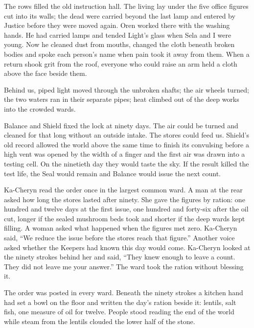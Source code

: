 The rows filled the old instruction hall. The living lay under the five office figures cut into its walls; the dead were carried beyond the last lamp and entered by Justice before they were moved again. Oren worked there with the washing hands. He had carried lamps and tended Light's glass when Sela and I were young. Now he cleaned dust from mouths, changed the cloth beneath broken bodies and spoke each person's name when pain took it away from them. When a return shook grit from the roof, everyone who could raise an arm held a cloth above the face beside them.\par

Behind us, piped light moved through the unbroken shafts; the air wheels turned; the two waters ran in their separate pipes; heat climbed out of the deep works into the crowded wards.\par

\ornament

Balance and Shield fixed the lock at ninety days. The air could be turned and cleaned for that long without an outside intake. The stores could feed us. Shield's old record allowed the world above the same time to finish its convulsing before a high vent was opened by the width of a finger and the first air was drawn into a testing cell. On the ninetieth day they would taste the sky. If the result killed the test life, the Seal would remain and Balance would issue the next count.\par

Ka-Cheryn read the order once in the largest common ward. A man at the rear asked how long the stores lasted after ninety. She gave the figures by ration: one hundred and twelve days at the first issue, one hundred and forty-six after the oil cut, longer if the sealed mushroom beds took and shorter if the deep wards kept filling. A woman asked what happened when the figures met zero. Ka-Cheryn said, ``We reduce the issue before the stores reach that figure.'' Another voice asked whether the Keepers had known this day would come. Ka-Cheryn looked at the ninety strokes behind her and said, ``They knew enough to leave a count. They did not leave me your answer.'' The ward took the ration without blessing it.\par

The order was posted in every ward. Beneath the ninety strokes a kitchen hand had set a bowl on the floor and written the day's ration beside it: lentils, salt fish, one measure of oil for twelve. People stood reading the end of the world while steam from the lentils clouded the lower half of the stone.\par


